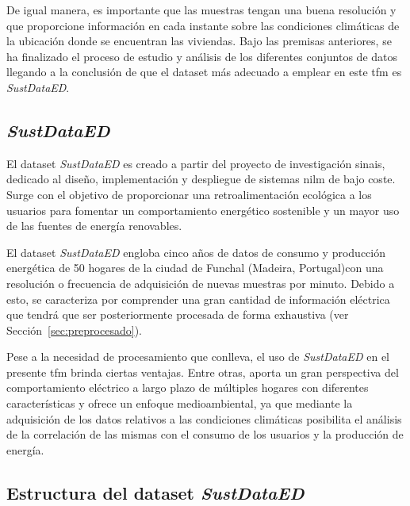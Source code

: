\vspace{3mm}

De igual manera, es importante que las muestras tengan una buena resolución y que proporcione información en cada instante sobre las condiciones climáticas de la ubicación donde se encuentran las viviendas. Bajo las premisas anteriores, se ha finalizado el proceso de estudio y análisis de los diferentes conjuntos de datos llegando a la conclusión de que el dataset más adecuado a emplear en este \gls{tfm} es \textit{SustDataED}.

\subsection{\textit{SustDataED}}
\label{sec:sustdataed}

El dataset \textit{SustDataED} \cite{sustdata} es creado a partir del proyecto de investigación \gls{sinais}, dedicado al diseño, implementación y despliegue de sistemas \gls{nilm} de bajo coste. Surge con el objetivo de proporcionar una retroalimentación ecológica a los usuarios para fomentar un comportamiento energético sostenible y un mayor uso de las fuentes de energía renovables.

\vspace{3mm}

El dataset \textit{SustDataED} engloba cinco años de datos de consumo y producción energética de 50 hogares de la ciudad de Funchal (Madeira, Portugal)con una resolución o frecuencia de adquisición de nuevas muestras por minuto. Debido a esto, se caracteriza por comprender una gran cantidad de información eléctrica que tendrá que ser posteriormente procesada de forma exhaustiva (ver Sección~\ref{sec:preprocesado}).

\vspace{3mm}

Pese a la necesidad de procesamiento que conlleva, el uso de \textit{SustDataED} en el presente \gls{tfm} brinda ciertas ventajas. Entre otras, aporta un gran perspectiva del comportamiento eléctrico a largo plazo de múltiples hogares con diferentes características y ofrece un enfoque medioambiental, ya que mediante la adquisición de los datos relativos a las condiciones climáticas posibilita el análisis de la correlación de las mismas con el consumo de los usuarios y la producción de energía.

\subsection{Estructura del dataset \textit{SustDataED}}
\label{sec:estructurasustdata}

